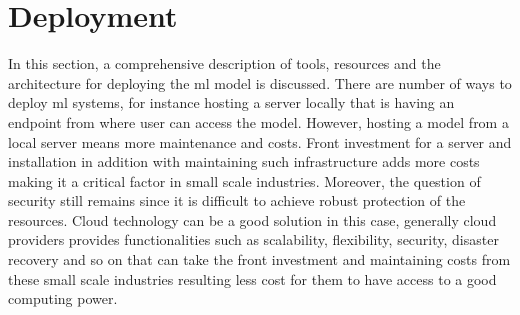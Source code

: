 \section{Deployment\label{deployment_methods}}

In this section, a comprehensive description of tools, resources and the architecture for deploying the \acrshort{ml} model is discussed. There are number of ways to deploy \acrshort{ml} systems, for instance hosting a server locally that is having an endpoint from where user can access the model. However, hosting a model from a local server means more maintenance and costs. Front investment for a server and installation in addition with maintaining such infrastructure adds more costs making it a critical factor in small scale industries. Moreover, the question of security still remains since it is difficult to achieve robust protection of the resources. Cloud technology can be a good solution in this case, generally cloud providers provides functionalities such as scalability, flexibility, security, disaster recovery and so on that can take the front investment and maintaining costs from these small scale industries resulting less cost for them to have access to a good computing power. 


